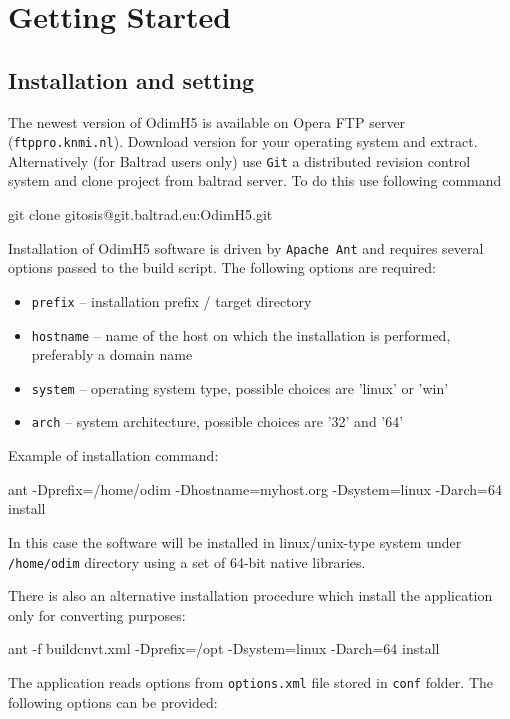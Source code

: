 \documentclass[11p]{article}
\begin{document}
\section{Getting Started}

\subsection{Installation and setting}

The newest version of OdimH5 is available on Opera FTP server
(\texttt{ftppro.knmi.nl}). Download version for your operating system and
extract. Alternatively (for Baltrad users only) use \texttt{Git} a distributed
revision control system and clone project from baltrad server. To do this use following command
\begin{kod}
git clone gitosis@git.baltrad.eu:OdimH5.git
\end{kod}

Installation of OdimH5 software is driven by \texttt{Apache Ant} and requires
several options passed to the build script. The following options are required:
\begin{itemize}
    \item \texttt{prefix} -- installation prefix / target directory 
    \item \texttt{hostname} -- name of the host on which the installation is
performed, preferably a domain name  
    \item \texttt{system} -- operating system type, possible choices are 'linux'
or 'win' 
    \item \texttt{arch} -- system architecture, possible choices are '32' and
'64'
\end{itemize}

Example of installation command:
\begin{kod} 
ant -Dprefix=/home/odim -Dhostname=myhost.org -Dsystem=linux -Darch=64 install
\end{kod}

In this case the software will be installed in linux/unix-type system under 
\texttt{/home/odim} directory using a set of 64-bit native libraries.

There is also an alternative installation procedure which install the
application only for converting purposes:
\begin{kod} 
ant -f buildcnvt.xml -Dprefix=/opt -Dsystem=linux -Darch=64 install
\end{kod}

The application reads options from \texttt{options.xml} file stored in
\texttt{conf} folder. The following options can be provided:
\end{document}
